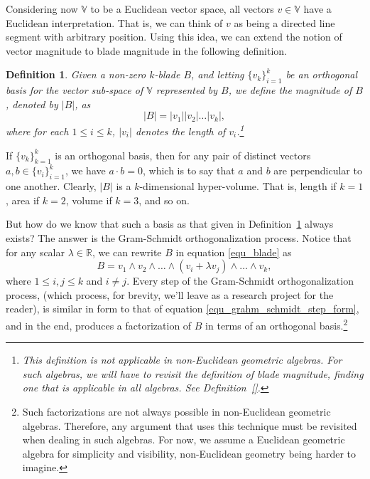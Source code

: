 \documentclass[12pt]{article}
\numberwithin{equation}{section}
\newcommand{\V}{\mathbb{V}}
\newcommand{\R}{\mathbb{R}}
\newtheorem{definition}{Definition}[section]
\begin{document}
Considering now $\V$ to be a Euclidean vector space, all vectors $v\in\V$ have
a Euclidean interpretation.  That is, we can think of $v$ as being a directed
line segment with arbitrary position.  Using this idea, we can extend the notion
of vector magnitude to blade magnitude in the following definition.
\begin{definition}\label{def_blade_mag}
Given a non-zero $k$-blade $B$, and letting $\{v_k\}_{i=1}^k$ be
an orthogonal basis for the vector sub-space of $\V$ represented
by $B$, we define the magnitude of $B$, denoted by $|B|$, as
\begin{equation}
|B| = |v_1||v_2|\dots |v_k|,
\end{equation}
where for each $1\leq i\leq k$, $|v_i|$ denotes the length of $v_i$.\footnote{This definition is
not applicable in non-Euclidean geometric algebras.  For such algebras, we will have to revisit
the definition of blade magnitude, finding one that is applicable in all algebras.  See Definition~\ref{}.}
\end{definition}
If $\{v_k\}_{k=1}^k$ is an orthogonal basis, then for any pair of distinct vectors $a,b\in\{v_i\}_{i=1}^k$,
we have $a\cdot b=0$, which is to say that $a$ and $b$ are perpendicular to one another.
Clearly, $|B|$ is a $k$-dimensional hyper-volume.  That is, length if $k=1$, area if $k=2$, volume
if $k=3$, and so on.

But how do we know that such a basis as that given in Definition~\ref{def_blade_mag} always exists?
The answer is the Gram-Schmidt orthogonalization process.
Notice that for any scalar $\lambda\in\R$,
we can rewrite $B$ in equation \eqref{equ_blade} as
\begin{equation}\label{equ_grahm_schmidt_step_form}
B = v_1\wedge v_2\wedge\dots\wedge(v_i+\lambda v_j)\wedge\dots\wedge v_k,
\end{equation}
where $1\leq i,j\leq k$ and $i\neq j$.  Every step of the Gram-Schmidt
orthogonalization process, (which process, for brevity, we'll leave as a research project for the reader),
is similar in form to that of equation \eqref{equ_grahm_schmidt_step_form}, and in the end, produces
a factorization of $B$ in terms of an orthogonal basis.\footnote{Such factorizations are not
always possible in non-Euclidean geometric algebras.  Therefore, any argument that uses
this technique must be revisited when dealing in such algebras.  For now, we assume a
Euclidean geometric algebra for simplicity and visibility, non-Euclidean geometry being harder to imagine.}
\end{document}
